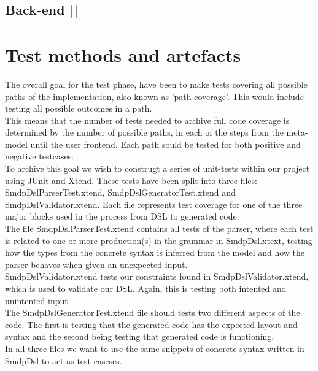 \documentclass[paper=a4, fontsize=11pt]{scrartcl} %
\numberwithin{equation}{section} %
\numberwithin{figure}{section} %
\numberwithin{table}{section} %
\begin{document}
\subsection{Back-end ||}

\section{Test methods and artefacts}
The overall goal for the test phase, have been to make tests covering all possible paths of the implementation, also known as 'path coverage'. This would include testing all possible outcomes in a path.\\ 
This means that the number of tests needed to archive full code coverage is determined by the number of possible paths, in each of the steps from the meta-model until the user frontend. Each path sould be tested for both positive and negative testcases.\\

To archive this goal we wish to construgt a series of unit-tests within our project using JUnit and Xtend. These tests have been split into three files: SmdpDslParserTest.xtend, SmdpDslGeneratorTest.xtend and SmdpDslValidator.xtend. Each file represents test coverage for one of the three major blocks used in the process from DSL to generated code.\\
The file SmdpDslParserTest.xtend contains all tests of the parser, where each test is related to one or more production(s) in the grammar in SmdpDsl.xtext, testing how the types from the concrete syntax is inferred from the model and how the parser behaves when given an unexpected input.\\ 
SmdpDslValidator.xtend tests our constraints found in SmdpDslValidator.xtend, which is used to validate our DSL. Again, this is testing both intented and unintented input.\\ 
The SmdpDslGeneratorTest.xtend file should tests two different aspects of the code. The first is testing that the generated code has the expected layout and syntax and the second being testing that generated code is functioning. \\
In all three files we want to use the same snippets of concrete syntax written in SmdpDsl to act as test caseses.\newline
\end{document}

